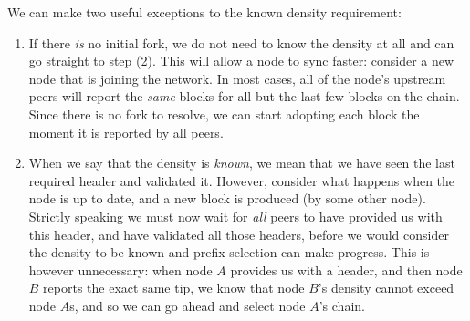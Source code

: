 \pagebreak

We can make two useful exceptions to the known density requirement:

\begin{enumerate}
\item If there \emph{is} no initial fork, we do not need to know the density at
all and can go straight to step (2). This will allow a node to sync faster:
consider a new node that is joining the network. In most cases, all of the
node's upstream peers will report the \emph{same} blocks for all but the last
few blocks on the chain. Since there is no fork to resolve, we can start
adopting each block the moment it is reported by all peers.

\item When we say that the density is \emph{known}, we mean that we have seen
the last required header and validated it. However, consider what happens when
the node is up to date, and a new block is produced (by some other node).
Strictly speaking we must now wait for \emph{all} peers to have provided us with
this header, and have validated all those headers, before we would consider the
density to be known and prefix selection can make progress. This is however
unnecessary: when node $A$ provides us with a header, and then node $B$ reports
the exact same tip, we know that node $B$'s density cannot exceed node $A$s, and
so we can go ahead and select node $A$'s chain.
\end{enumerate}

